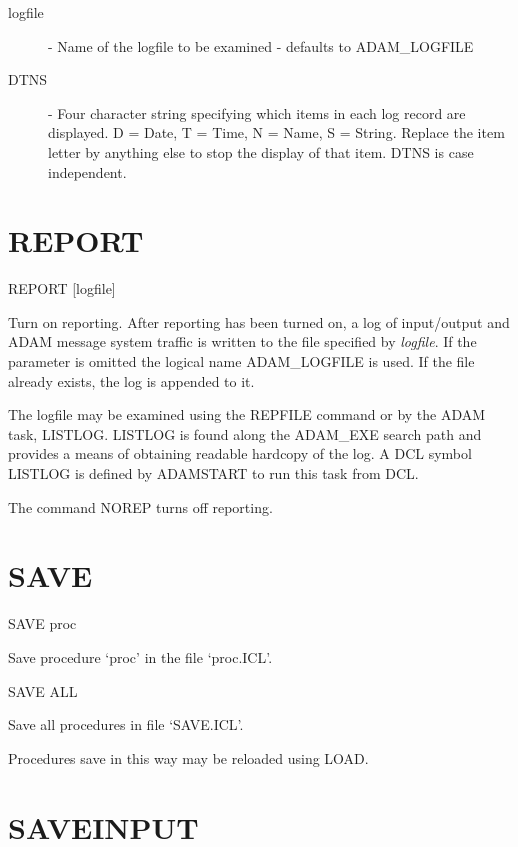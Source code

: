 \documentclass[twoside,11pt]{report}
\newcommand{\xlabel}[1]{}
\begin{document}
\begin{description}

\item[logfile] -  Name of the logfile to be examined - defaults to
ADAM\_LOGFILE

\item[DTNS]  -  Four character string specifying which items in each log
record are displayed.
D = Date, T = Time, N = Name, S = String.
Replace the item letter by anything else to stop the display of that item.
DTNS is case independent.

\end{description}

\section{\xlabel{REPORT}REPORT\label{REPORT}}

    REPORT \hspace{.5cm} [logfile]

Turn on reporting. After reporting has been turned on, a log of input/output and
ADAM message system traffic is written to the file specified by {\it logfile}.
If the parameter is omitted the logical name ADAM\_LOGFILE is used.
If the file already exists, the log is appended to it.

The logfile may be examined using the REPFILE command or by the ADAM task,
LISTLOG. LISTLOG is found along the ADAM\_EXE search path and provides a means
of obtaining readable hardcopy of the log. A DCL symbol LISTLOG is defined
by ADAMSTART to run this task from DCL.

The command NOREP turns off reporting.


\section{\xlabel{SAVE}SAVE\label{SAVE}}

   SAVE \hspace{.5cm} proc

 Save procedure `proc' in the file `proc.ICL'.

   SAVE  ALL

 Save all procedures in file `SAVE.ICL'.

 Procedures save in this way may be reloaded using LOAD.

\section{\xlabel{SAVEINPUT}SAVEINPUT\label{SAVEINPUT}}
\end{document}
